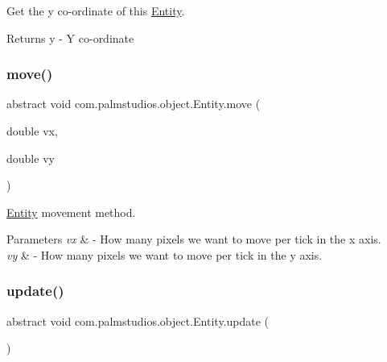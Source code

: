 Get the y co-\/ordinate of this \hyperlink{classcom_1_1palmstudios_1_1object_1_1_entity}{Entity}.

\begin{DoxyReturn}{Returns}
y -\/ Y co-\/ordinate 
\end{DoxyReturn}
\mbox{\label{classcom_1_1palmstudios_1_1object_1_1_entity_a793d82474f4df98487e4cfee77b89578}} 
\subsubsection{\texorpdfstring{move()}{move()}}
{\footnotesize\ttfamily abstract void com.\+palmstudios.\+object.\+Entity.\+move (\begin{DoxyParamCaption}\item[{double}]{vx,  }\item[{double}]{vy }\end{DoxyParamCaption})\hspace{0.3cm}{\ttfamily [abstract]}}

\hyperlink{classcom_1_1palmstudios_1_1object_1_1_entity}{Entity} movement method. 
\begin{DoxyParams}{Parameters}
{\em vx} & -\/ How many pixels we want to move per tick in the x axis. \\
\hline
{\em vy} & -\/ How many pixels we want to move per tick in the y axis. \\
\hline
\end{DoxyParams}
\mbox{\label{classcom_1_1palmstudios_1_1object_1_1_entity_ac36154420e14204de3c508af9e111bee}} 
\subsubsection{\texorpdfstring{update()}{update()}}
{\footnotesize\ttfamily abstract void com.\+palmstudios.\+object.\+Entity.\+update (\begin{DoxyParamCaption}{ }\end{DoxyParamCaption})\hspace{0.3cm}{\ttfamily [abstract]}}

